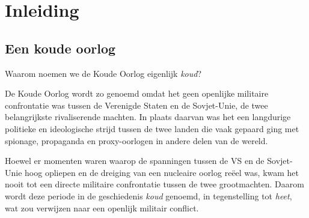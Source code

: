 \chapter{Inleiding}
\section{Een koude oorlog}

Waarom noemen we de Koude Oorlog eigenlijk \emph{koud}?

De Koude Oorlog wordt zo genoemd omdat het geen openlijke militaire confrontatie was tussen de Verenigde Staten en de Sovjet-Unie, de twee belangrijkste rivaliserende machten. In plaats daarvan was het een langdurige politieke en ideologische strijd tussen de twee landen die vaak gepaard ging met spionage, propaganda en proxy-oorlogen in andere delen van de wereld.

Hoewel er momenten waren waarop de spanningen tussen de VS en de Sovjet-Unie hoog opliepen en de dreiging van een nucleaire oorlog reëel was, kwam het nooit tot een directe militaire confrontatie tussen de twee grootmachten. Daarom wordt deze periode in de geschiedenis \emph{koud} genoemd, in tegenstelling tot \emph{heet}, wat zou verwijzen naar een openlijk militair conflict.
